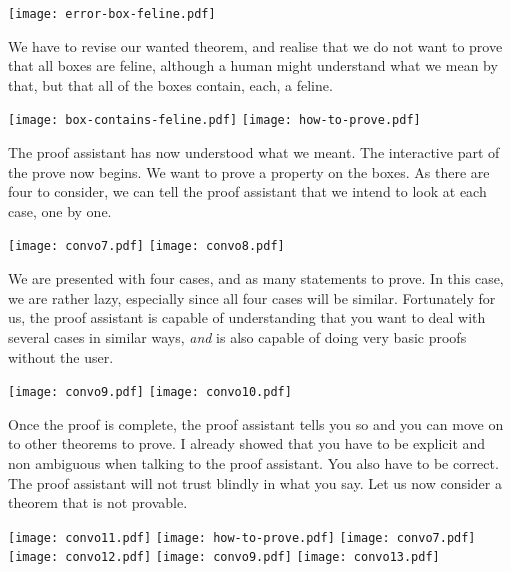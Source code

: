\begin{center}
  \texttt{[image: error-box-feline.pdf]}
\end{center}

We have to revise our wanted theorem, and realise that we do not want to prove
that all boxes are feline, although a human might understand what we mean by
that, but that all of the boxes contain, each, a feline.

\begin{center}
  \texttt{[image: box-contains-feline.pdf]}
  \texttt{[image: how-to-prove.pdf]}
\end{center}

The proof assistant has now understood what we meant. The interactive part of
the prove now begins. We want to prove a property on the boxes. As there are
four to consider, we can tell the proof assistant that we intend to look at each
case, one by one.

\begin{center}
  \texttt{[image: convo7.pdf]}
  \texttt{[image: convo8.pdf]}
\end{center}

We are presented with four cases, and as many statements to prove.
In this case, we are rather lazy, especially since all four cases will be
similar. Fortunately for us, the proof assistant is capable of understanding
that you want to deal with several cases in similar ways, \emph{and} is also
capable of doing very basic proofs without the user.

\begin{center}
  \texttt{[image: convo9.pdf]}
  \texttt{[image: convo10.pdf]}
\end{center}

Once the proof is complete, the proof assistant tells you so and you can move on
to other theorems to prove. I already showed that you have to be explicit and
non ambiguous when talking to the proof assistant. You also have to be correct.
The proof assistant will not trust blindly in what you say.
%
Let us now consider a theorem that is not provable.

\begin{center}
  \texttt{[image: convo11.pdf]}
  \texttt{[image: how-to-prove.pdf]}
  \texttt{[image: convo7.pdf]}
  \texttt{[image: convo12.pdf]}
  \texttt{[image: convo9.pdf]}
  \texttt{[image: convo13.pdf]}
\end{center}


